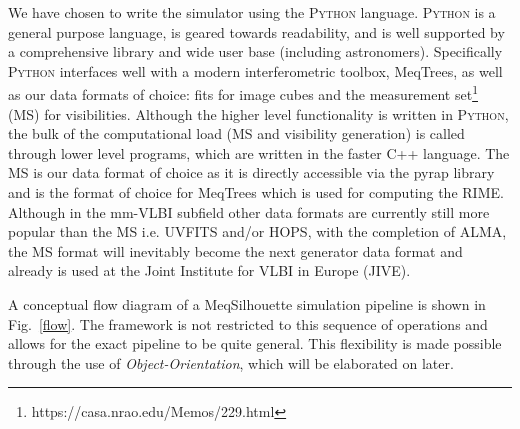 We have chosen to write the simulator using the \textsc{Python} language. \textsc{Python} is a general purpose language, is geared towards readability, and is well supported by a comprehensive library and wide user base (including astronomers). Specifically \textsc{Python} interfaces well with a modern interferometric toolbox, {\sc MeqTrees}, as well as our data formats of choice: {\sc fits} for image cubes and the {\sc measurement set}\footnote{https://casa.nrao.edu/Memos/229.html} (MS) for visibilities. Although the higher level functionality is written in \textsc{Python}, the bulk of the computational load (MS and visibility generation) is called through lower level programs, which are written in the faster {\sc C++} language. 
The MS is our data format of choice as it is directly accessible via the {\sc pyrap} library and is the format of choice for {\sc MeqTrees} which is used for computing the RIME. Although in the mm-VLBI subfield other data formats are currently still more popular than the MS i.e. {\sc UVFITS} and/or {\sc HOPS}, with the completion of ALMA, the MS format will inevitably become the next generator data format and already is used at the Joint Institute for VLBI in Europe (JIVE). 




A conceptual flow diagram of a {\sc MeqSilhouette} simulation pipeline is shown in Fig.~\ref{flow}. The framework is not restricted to this sequence of operations and allows for the exact pipeline to be quite general. This flexibility is made possible through the use of \emph{Object-Orientation}, which will be elaborated on later.

